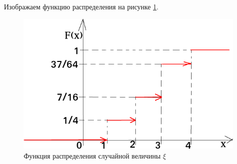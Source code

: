 Изображаем функцию распределения на рисунке \ref{fig:1212}.

\begin{figure}[h!]
  \centering
  \includegraphics[width=1\textwidth]{./pictures/12_12.png}
  \caption{Функция распределения случайной величины $ \xi $}
  \label{fig:1212}
\end{figure}
